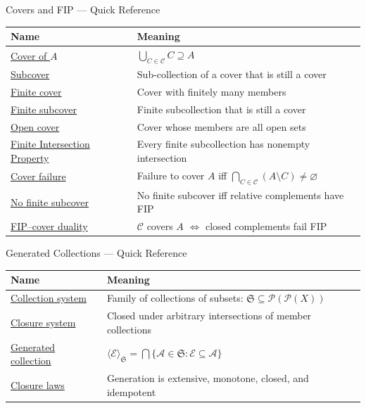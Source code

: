\begin{toolkitbox}{Covers and FIP --- Quick Reference}
\small
\begin{tabular}{l l}
\toprule
\textbf{Name}  & \textbf{Meaning} \\
\midrule
\hyperref[def:cover-full]{Cover of $A$}      & $\bigcup_{C \in \mathcal{C}} C \supseteq A$                     \\
\hyperref[def:subcover]{Subcover}          & Sub-collection of a cover that is still a cover                 \\
\hyperref[def:finite-cover]{Finite cover}      & Cover with finitely many members                                \\
\hyperref[def:subcover]{Finite subcover}   & Finite subcollection that is still a cover                      \\
\hyperref[def:open-cover]{Open cover}        & Cover whose members are all open sets                           \\
\hyperref[def:fip]{Finite Intersection Property}  & Every finite subcollection has nonempty intersection \\
\hyperref[thm:cover-failure-relative-complements]{Cover failure} & Failure to cover $A$ iff $\bigcap_{C\in\mathcal C}(A\setminus C)\neq\varnothing$ \\
\hyperref[thm:no-finite-subcover-fip]{No finite subcover} & No finite subcover iff relative complements have FIP \\
\hyperref[prop:fip-duality]{FIP--cover duality}  & $\mathcal{C}$ covers $A$ $\iff$ closed complements fail FIP   \\
\bottomrule
\end{tabular}
\end{toolkitbox}



\begin{toolkitbox}{Generated Collections --- Quick Reference}
\small
\begin{tabular}{l l}
\toprule
\textbf{Name}  & \textbf{Meaning} \\
\midrule
\hyperref[def:collection-system]{Collection system} & Family of collections of subsets: $\mathfrak S\subseteq\mathcal P(\mathcal P(X))$ \\
\hyperref[def:closure-system]{Closure system} & Closed under arbitrary intersections of member collections \\
\hyperref[def:generated-collection]{Generated collection} & $\langle\mathcal E\rangle_{\mathfrak S}=\bigcap\{\mathcal A\in\mathfrak S:\mathcal E\subseteq\mathcal A\}$ \\
\hyperref[thm:generated-collection-closure-laws]{Closure laws} & Generation is extensive, monotone, closed, and idempotent \\
\bottomrule
\end{tabular}
\end{toolkitbox}

